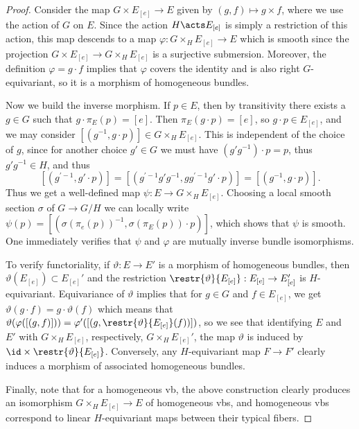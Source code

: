 \begin{proof}
    Consider the map $G\times E_{[e]}\to E$ given by $(g,f)\mapsto g\times f$, where we use the action of $G$ on $E$. Since the action $H\acts E_{[e]}$ is simply a restriction of this action, this map descends to a map $\varphi:G\times_H E_{[e]}\to E$ which is smooth since the projection $G\times E_{[e]}\to G\times_H E_{[e]}$ is a surjective submersion. Moreover, the definition $\varphi=g\cdot f$ implies that $\varphi$ covers the identity and is also right $G$-equivariant, so it is a morphism of homogeneous bundles.

    Now we build the inverse morphism. If $p\in E$, then by transitivity there exists a $g\in G$ such that $g\cdot \pi_E(p)=[e]$. Then $\pi_E(g\cdot p)=[e]$, so $g\cdot p\in E_{[e]}$, and we may consider $[(g^{-1},g\cdot p)]\in G\times_H E_{[e]}$. This is independent of the choice of $g$, since for another choice $g'\in G$ we must have $(g'g^{-1})\cdot p=p$, thus $g'g^{-1}\in H$, and thus
    \[[(g^{\prime-1},g'\cdot p)]=[(g^{\prime-1}g'g^{-1},gg^{\prime-1}g'\cdot p)]=[(g^{-1},g\cdot p)].\]
    Thus we get a well-defined map $\psi:E\to G\times_H E_{[e]}$. Choosing a local smooth section $\sigma$ of $G\to G\slash H$ we can locally write $\psi(p)=[(\sigma(\pi_e(p))^{-1},\sigma(\pi_E(p))\cdot p)]$, which shows that $\psi$ is smooth. One immediately verifies that $\psi$ and $\varphi$ are mutually inverse bundle isomorphisms.

    To verify functoriality, if $\vartheta:E\to E'$ is a morphism of homogeneous bundles, then $\vartheta(E_{[e]})\subset E_{[e]}'$ and the restriction $\restr{\vartheta}{E_{[e]}}:E_{[e]}\to E_{[e]}'$ is $H$-equivariant. Equivariance of $\vartheta$ implies that for $g\in G$ and $f\in E_{[e]}$, we get $\vartheta(g\cdot f)=g\cdot \vartheta(f)$ which means that $\vartheta(\varphi([(g,f)]))=\varphi'([(g,\restr{\vartheta}{E_{[e]}}(f))])$, so we see that identifying $E$ and $E'$ with $G\times_H E_{[e]}$, respectively, $G\times_H E_{[e]}'$, the map $\vartheta$ is induced by $\id\times \restr{\vartheta}{E_{[e]}}$. Conversely, any $H$-equivariant map $F\to F'$ clearly induces a morphism of associated homogeneous bundles.

    Finally, note that for a homogeneous \gls{vb}, the above construction clearly produces an isomorphism $G\times_H E_{[e]}\to E$ of homogeneous \glspl{vb}, and homogeneous \glspl{vb} correspond to linear $H$-equivariant maps between their typical fibers.
\end{proof}

